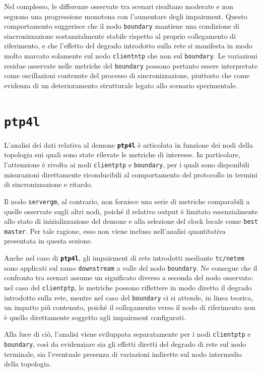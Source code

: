 Nel complesso, le differenze osservate tra scenari risultano moderate e non seguono
una progressione monotona con l’aumentare degli impairment. Questo comportamento
suggerisce che il nodo \texttt{boundary} mantiene una condizione di sincronizzazione
sostanzialmente stabile rispetto al proprio collegamento di riferimento, e che
l’effetto del degrado introdotto sulla rete si manifesta in modo molto marcato
solamente sul nodo \texttt{clientntp} che non sul \texttt{boundary}. Le variazioni
residue osservate nelle metriche del \texttt{boundary} possono pertanto essere
interpretate come oscillazioni contenute del processo di sincronizzazione, piuttosto
che come evidenza di un deterioramento strutturale legato allo scenario sperimentale.

\section{\texttt{ptp4l}}
L’analisi dei dati relativa al demone \texttt{\textbf{ptp4l}} è articolata in
funzione dei nodi della topologia sui quali sono state rilevate le metriche di
interesse. In particolare, l’attenzione è rivolta ai nodi \texttt{clientptp} e \texttt{boundary},
per i quali sono disponibili misurazioni direttamente riconducibili al comportamento
del protocollo in termini di sincronizzazione e ritardo.

Il nodo \texttt{servergm}, al contrario, non fornisce una serie di metriche
comparabili a quelle osservate sugli altri nodi, poiché il relativo output è limitato
essenzialmente allo stato di inizializzazione del demone e alla selezione del clock
locale come \texttt{best master}. Per tale ragione, esso non viene incluso
nell’analisi quantitativa presentata in questa sezione.

Anche nel caso di \texttt{\textbf{ptp4l}}, gli impairment di rete introdotti
mediante \texttt{tc/netem} sono applicati sul ramo \texttt{downstream} a valle
del nodo \texttt{boundary}. Ne consegue che il confronto tra scenari assume un
significato diverso a seconda del nodo osservato: nel caso del \texttt{clientptp},
le metriche possono riflettere in modo diretto il degrado introdotto sulla rete,
mentre nel caso del \texttt{boundary} ci si attende, in linea teorica, un impatto
più contenuto, poiché il collegamento verso il nodo di riferimento non è quello
direttamente soggetto agli impairment configurati.

Alla luce di ciò, l’analisi viene sviluppata separatamente per i nodi \texttt{clientptp}
e \texttt{boundary}, così da evidenziare sia gli effetti diretti del degrado di
rete sul nodo terminale, sia l’eventuale presenza di variazioni indirette sul nodo
intermedio della topologia.

